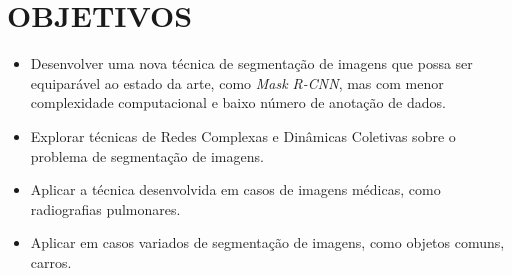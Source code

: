 \chapter{OBJETIVOS}\label{cap:objetivos}

\begin{itemize}
\item Desenvolver uma nova técnica de segmentação de imagens que possa ser
equiparável ao estado da arte, como \textit{Mask R-CNN}, mas com menor
complexidade computacional e baixo número de anotação de dados.
\item Explorar técnicas de Redes Complexas e Dinâmicas Coletivas sobre
  o problema de segmentação de imagens.
\item Aplicar a técnica desenvolvida em casos de imagens médicas, como
  radiografias pulmonares.
\item Aplicar em casos variados de segmentação de imagens, como
  objetos comuns, carros.
\end{itemize}
